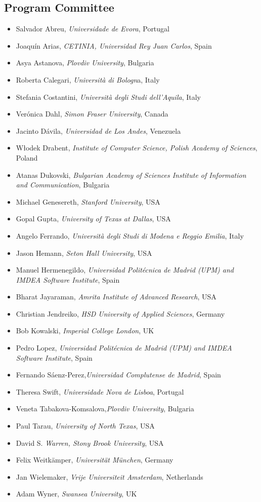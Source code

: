\documentclass[
]{ceurart}
\begin{document}
\subsection*{Program Committee}
\begin{itemize}
\item Salvador Abreu, \emph{Universidade de Evora}, Portugal
\item Joaquín Arias, \emph{CETINIA, Universidad Rey Juan Carlos}, Spain
\item Asya Astanova, \emph{Plovdiv University}, Bulgaria
\item Roberta Calegari, \emph{Università di Bologn}a, Italy
\item Stefania Costantini, \emph{Università degli Studi dell'Aquila}, Italy
\item Verónica Dahl, \emph{Simon Fraser University}, Canada
\item Jacinto Dávila, \emph{Universidad de Los Andes}, Venezuela
\item Włodek Drabent, \emph{Institute of Computer Science, Polish Academy of Sciences}, Poland
\item Atanas Dukovski, \emph{Bulgarian Academy of Sciences Institute of Information and Communication}, Bulgaria
\item Michael Genesereth, \emph{Stanford University}, USA
\item Gopal Gupta, \emph{University of Texas at Dallas}, USA
\item Angelo Ferrando, \emph{Università degli Studi di Modena e Reggio Emilia}, Italy
\item Jason Hemann, \emph{Seton Hall University}, USA
\item Manuel Hermenegildo, \emph{Universidad Politécnica de Madrid (UPM) and IMDEA Software Institute}, Spain
\item Bharat Jayaraman, \emph{Amrita Institute of Advanced Research},  USA
\item Christian Jendreiko, \emph{HSD University of Applied Sciences},  Germany
\item Bob Kowalski, \emph{Imperial College London}, UK
\item Pedro Lopez, \emph{Universidad Politécnica de Madrid (UPM) and IMDEA Software Institute}, Spain
\item Fernando Sáenz-Perez,\emph{Universidad Complutense de Madrid}, Spain
\item Theresa Swift, \emph{Universidade Nova de Lisboa}, Portugal
\item Veneta Tabakova-Komsalova,\emph{Plovdiv University}, Bulgaria
\item Paul Tarau, \emph{University of North Texas}, USA
\item David S. \emph{Warren, Stony Brook University}, USA
\item Felix Weitkämper, \emph{Universität München}, Germany
\item Jan Wielemaker, \emph{Vrije Universiteit Amsterdam}, Netherlands
\item Adam Wyner, \emph{Swansea University}, UK
\end{itemize}
\end{document}

